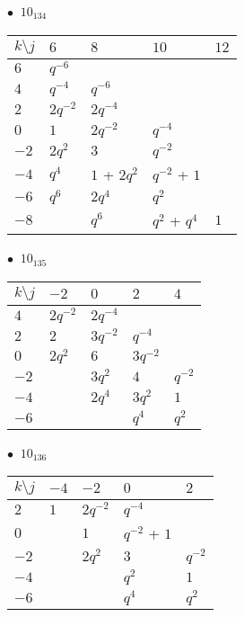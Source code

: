 %
\begin{minipage}{\linewidth}
$\bullet\ $ $10_{134}$ \vspace{0.5em} \\
\begin{tabular}{l|llll}
$k \setminus j$ & $6$ & $8$ & $10$ & $12$ \\
\hline
$6$ & $q^{-6}$ &  &  &  \\
$4$ & $q^{-4}$ & $q^{-6}$ &  &  \\
$2$ & $2q^{-2}$ & $2q^{-4}$ &  &  \\
$0$ & $1$ & $2q^{-2}$ & $q^{-4}$ &  \\
$-2$ & $2q^{2}$ & $3$ & $q^{-2}$ &  \\
$-4$ & $q^{4}$ & $1$ + $2q^{2}$ & $q^{-2}$ + $1$ &  \\
$-6$ & $q^{6}$ & $2q^{4}$ & $q^{2}$ &  \\
$-8$ &  & $q^{6}$ & $q^{2}$ + $q^{4}$ & $1$ \\
\end{tabular}
\vspace{2em}
\end{minipage}
%
\begin{minipage}{\linewidth}
$\bullet\ $ $10_{135}$ \vspace{0.5em} \\
\begin{tabular}{l|llll}
$k \setminus j$ & $-2$ & $0$ & $2$ & $4$ \\
\hline
$4$ & $2q^{-2}$ & $2q^{-4}$ &  &  \\
$2$ & $2$ & $3q^{-2}$ & $q^{-4}$ &  \\
$0$ & $2q^{2}$ & $6$ & $3q^{-2}$ &  \\
$-2$ &  & $3q^{2}$ & $4$ & $q^{-2}$ \\
$-4$ &  & $2q^{4}$ & $3q^{2}$ & $1$ \\
$-6$ &  &  & $q^{4}$ & $q^{2}$ \\
\end{tabular}
\vspace{2em}
\end{minipage}
%
\begin{minipage}{\linewidth}
$\bullet\ $ $10_{136}$ \vspace{0.5em} \\
\begin{tabular}{l|llll}
$k \setminus j$ & $-4$ & $-2$ & $0$ & $2$ \\
\hline
$2$ & $1$ & $2q^{-2}$ & $q^{-4}$ &  \\
$0$ &  & $1$ & $q^{-2}$ + $1$ &  \\
$-2$ &  & $2q^{2}$ & $3$ & $q^{-2}$ \\
$-4$ &  &  & $q^{2}$ & $1$ \\
$-6$ &  &  & $q^{4}$ & $q^{2}$ \\
\end{tabular}
\vspace{2em}
\end{minipage}
